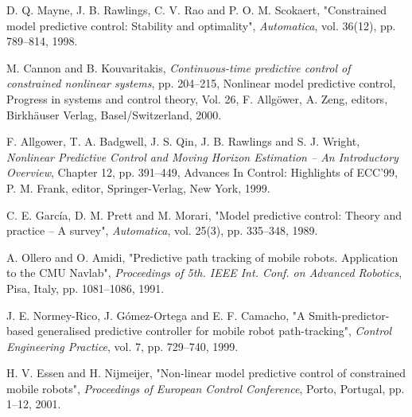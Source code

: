 \documentclass[twocolumn]{IEEEtran} %
\begin{document}
\begin{thebibliography}{}
D. Q. Mayne, J. B. Rawlings, C. V. Rao and P. O. M. Scokaert, 
"Constrained model predictive control: Stability and optimality",
{\em Automatica\/}, vol. 36(12), pp. 789--814, 1998.

M. Cannon and B. Kouvaritakis, 
{\em Continuous-time predictive control of constrained nonlinear systems},
pp. 204--215, Nonlinear model predictive control, Progress in systems and control theory, Vol. 26,
F. Allg\"{o}wer, A. Zeng, editors, Birkh\"{a}user Verlag, Basel/Switzerland, 2000.

F. Allgower, T. A. Badgwell, J. S. Qin, J. B. Rawlings and S. J. Wright, 
{\em Nonlinear Predictive Control and Moving Horizon Estimation -- An Introductory Overview},
Chapter 12, pp. 391--449, Advances In Control: Highlights of ECC'99,
P. M. Frank, editor, Springer-Verlag, New York, 1999.

C. E. Garc\'{i}a, D. M. Prett and M. Morari, 
"Model predictive control: Theory and practice -- A survey",
{\em Automatica\/}, vol. 25(3), pp. 335--348, 1989.

A. Ollero and O. Amidi,
"Predictive path tracking of mobile robots. Application to the CMU Navlab",
{\em Proceedings of 5th. IEEE Int. Conf. on Advanced Robotics\/}, Pisa, Italy, pp. 1081--1086, 1991.

J. E. Normey-Rico, J. G\'{o}mez-Ortega and E. F. Camacho, 
"A Smith-predictor-based generalised predictive controller for mobile robot path-tracking",
{\em Control Engineering Practice\/}, vol. 7, pp. 729--740, 1999.

H. V. Essen and H. Nijmeijer,
"Non-linear model predictive control of constrained mobile robots",
{\em Proceedings of European Control Conference\/}, Porto, Portugal, pp. 1--12, 2001.

\end{thebibliography}
\end{document}
